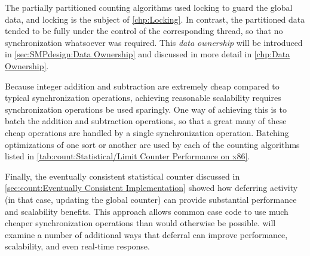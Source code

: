 \QuickQuizEnd

The partially partitioned counting algorithms used locking to
guard the global data, and locking is the subject of
\cref{chp:Locking}.
In contrast, the partitioned data tended to be fully under the control of
the corresponding thread, so that no synchronization whatsoever was required.
This \emph{data ownership} will be introduced in
\cref{sec:SMPdesign:Data Ownership}
and discussed in more detail in
\cref{chp:Data Ownership}.

Because integer addition and subtraction are extremely cheap
compared to typical synchronization operations, achieving reasonable
scalability requires synchronization operations be used sparingly.
One way of achieving this is to batch the addition and subtraction
operations, so that a great many of these cheap operations are handled
by a single synchronization operation.
Batching optimizations of one sort or another are used by each of
the counting algorithms listed in
\cref{tab:count:Statistical/Limit Counter Performance on x86}.

Finally, the eventually consistent statistical counter discussed in
\cref{sec:count:Eventually Consistent Implementation}
showed how deferring activity (in that case, updating the global
counter) can provide substantial performance and scalability benefits.
This approach allows common case code to use much cheaper synchronization
operations than would otherwise be possible.
 will examine a number of additional
ways that deferral can improve performance, scalability, and even
real-time response.

